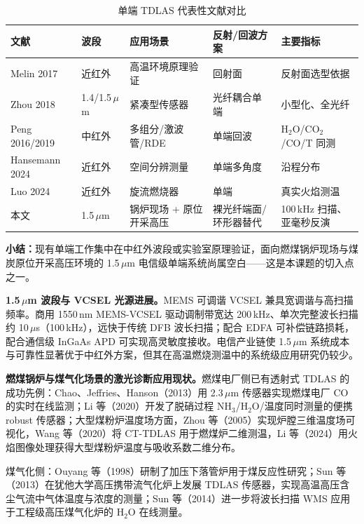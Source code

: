 \documentclass[12pt,a4paper]{article}
\begin{document}
\begin{table}[htbp]
  \centering
  \caption{单端 TDLAS 代表性文献对比}
  \begin{tabular}{lllll}
    \toprule
    文献 & 波段 & 应用场景 & 反射/回波方案 & 主要指标 \\
    \midrule
    Melin 2017\cite{melin2017} & 近红外 & 高温环境原理验证 & 回射面 & 反射面选型依据 \\
    Zhou 2018\cite{zhou2018} & 1.4/1.5\,$\mu$m & 紧凑型传感器 & 光纤耦合单端 & 小型化、全光纤 \\
    Peng 2016/2019\cite{peng2016,peng2019a,peng2019b} & 中红外 & 多组分/激波管/RDE & 单端回波 & H$_2$O/CO$_2$/CO/T 同测 \\
    Hansemann 2024\cite{hansemann2024} & 近红外 & 空间分辨测量 & 单端多角度 & 沿程分布 \\
    Luo 2024\cite{luo2024} & 近红外 & 旋流燃烧器 & 单端 & 真实火焰测温 \\
    本文 & 1.5\,$\mu$m & 锅炉现场 + 原位开采高压 & 裸光纤端面/环形器替代 & 100\,kHz 扫描、亚毫秒反演 \\
    \bottomrule
  \end{tabular}
\end{table}

\textbf{小结：}现有单端工作集中在中红外波段或实验室原理验证，面向燃煤锅炉现场与煤炭原位开采高压环境的 1.5\,$\mu$m 电信级单端系统尚属空白——这是本课题的切入点之一。

\textbf{1.5\,$\mu$m 波段与 VCSEL 光源进展。}MEMS 可调谐 VCSEL 兼具宽调谐与高扫描频率。商用 1550\,nm MEMS-VCSEL 驱动调制带宽达 200\,kHz、单次完整波长扫描约 10\,$\mu$s（100\,kHz），远快于传统 DFB 波长扫描；配合 EDFA 可补偿链路损耗，配合通信级 InGaAs APD 可实现高灵敏度接收。电信产业链使 1.5\,$\mu$m 系统成本与可靠性显著优于中红外方案，但其在高温燃烧测温中的系统级应用研究仍较少。

\textbf{燃煤锅炉与煤气化场景的激光诊断应用现状。}燃煤电厂侧已有透射式 TDLAS 的成功先例：Chao、Jeffries、Hanson（2013）用 2.3\,$\mu$m 传感器实现燃煤电厂 CO 的实时在线监测\cite{chao2013}；Li 等（2020）开发了脱硝过程 NH$_3$/H$_2$O/温度同时测量的便携 robust 传感器\cite{li2020}；大型煤粉炉温度场方面，Zhou 等（2005）实现炉膛三维温度场可视化\cite{zhou2005}，Wang 等（2020）将 CT-TDLAS 用于燃煤炉二维测温\cite{wang2020}，Li 等（2024）用火焰图像处理获得大型煤粉炉温度与吸收系数二维分布\cite{li2024}。

煤气化侧：Ouyang 等（1998）研制了加压下落管炉用于煤反应性研究\cite{ouyang1998}；Sun 等（2013）在犹他大学高压携带流气化炉上发展 TDLAS 传感器，实现高温高压含尘气流中气体温度与浓度的测量\cite{sun2013}；Sun 等（2014）进一步将波长扫描 WMS 应用于工程级高压煤气化炉的 H$_2$O 在线测量\cite{sun2014}。
\end{document}

